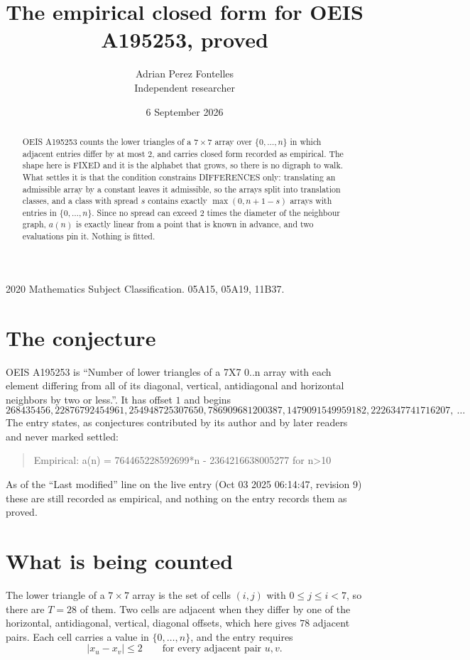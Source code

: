 \documentclass[11pt,a4paper]{article}
\title{The empirical closed form for OEIS A195253, proved}
\author{Adrian Perez Fontelles\\ \small Independent researcher}
\date{6 September 2026}
\theoremstyle{plain}
\theoremstyle{definition}
\begin{document}
\maketitle

\begin{abstract}
OEIS A195253 counts the lower triangles of a $7\times7$ array over $\{0,\dots,n\}$ in which
adjacent entries differ by at most $2$, and carries closed form recorded as empirical. The shape here is FIXED
and it is the alphabet that grows, so there is no digraph to walk. What settles it is that the
condition constrains DIFFERENCES only: translating an admissible array by a constant leaves it
admissible, so the arrays split into translation classes, and a class with spread $s$ contains
exactly $\max(0,n+1-s)$ arrays with entries in $\{0,\dots,n\}$. Since no spread can exceed
$2$ times the diameter of the neighbour graph, $a(n)$ is exactly linear from a point that is
known in advance, and two evaluations pin it. Nothing is fitted.
\end{abstract}

\noindent\small 2020 Mathematics Subject Classification. 05A15, 05A19, 11B37.\normalsize

\section{The conjecture}

OEIS A195253 is ``Number of lower triangles of a 7X7 0..n array with each element differing from all of its diagonal, vertical, antidiagonal and horizontal neighbors by two or less.''. It has offset $1$ and begins
\[
268435456, 22876792454961, 254948725307650, 786909681200387, 1479091549959182, 2226347741716207,\ \dots
\]
The entry states, as conjectures contributed by its author and by later readers and never
marked settled:
\begin{quote}
Empirical: a(n) = 764465228592699*n - 2364216638005277 for n>10
\end{quote}
As of the ``Last modified'' line on the live entry (Oct 03 2025 06:14:47, revision 9) these are still
recorded as empirical, and nothing on the entry records them as proved.

\section{What is being counted}

The lower triangle of a $7\times7$ array is the set of cells $(i,j)$ with $0\le j\le
i<7$, so there are $T=28$ of them. Two cells are adjacent when they differ by one of the
horizontal, antidiagonal, vertical, diagonal offsets, which here gives $78$ adjacent pairs. Each cell carries a value in
$\{0,\dots,n\}$, and the entry requires
\[
|x_u-x_v|\le 2\qquad\text{for every adjacent pair }u,v .
\]
\end{document}
